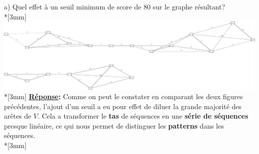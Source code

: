 \documentclass[11pt, letterpaper]{article}
\begin{document}
{\newpage
\flushleft
a) Quel effet à un seuil minimum de score de 80 sur le graphe résultant? \\*[3mm]
\includegraphics[width=\textwidth]{Images/Assemblage_no2_plus80.png} \\*[3mm]
\textbf{\underline{Réponse}:} Comme on peut le constater en comparant les deux figures précédentes, l'ajout d'un seuil a eu pour effet de diluer la grande majorité des arêtes de $V$. Cela a transformer le \textbf{tas} de séquences en une \textbf{série de séquences} presque linéaire, ce qui nous permet de distinguer les \textbf{patterns} dans les séquences. \\*[3mm]

}
\end{document}
